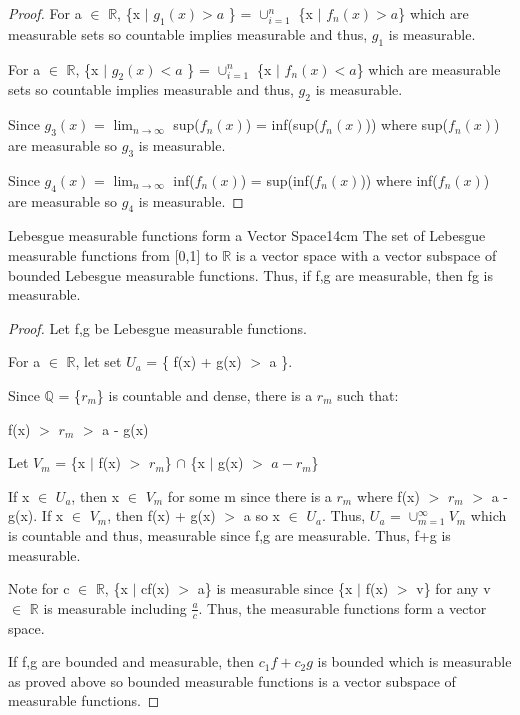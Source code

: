     \begin{proof}
        For a $\in$ $\mathbb{R}$, \{x $|$ $g_1(x) > a$ \}
        = $\cup_{i=1}^n$ \{x $|$ $f_n(x) > a$\}
        which are measurable sets so countable implies measurable
        and thus, $g_1$ is measurable.

        For a $\in$ $\mathbb{R}$, \{x $|$ $g_2(x) < a$ \}
        = $\cup_{i=1}^n$ \{x $|$ $f_n(x) < a$\}
        which are measurable sets so countable implies measurable
        and thus, $g_2$ is measurable.

        Since $g_3(x)$ = $\lim_{n \rightarrow \infty}$ sup($f_n(x)$)
        = inf(sup($f_n(x)$)) where sup($f_n(x)$) are measurable
        so $g_3$ is measurable.

        Since $g_4(x)$ = $\lim_{n \rightarrow \infty}$ inf($f_n(x)$)
        = sup(inf($f_n(x)$)) where inf($f_n(x)$) are measurable
        so $g_4$ is measurable.
    \end{proof}

    \newpage



    \begin{wtheorem}{Lebesgue measurable functions form a Vector Space}{14cm}
        The set of Lebesgue measurable functions from [0,1] to $\mathbb{R}$
        is a vector space with a vector subspace of bounded Lebesgue measurable
        functions. Thus, if f,g are measurable, then fg is measurable.
    \end{wtheorem}

    \begin{proof}
        Let f,g be Lebesgue measurable functions.

        For a $\in$ $\mathbb{R}$, let set $U_a$ = \{ f(x) + g(x) $>$ a \}.

        Since $\mathbb{Q}$ = \{$r_m$\} is countable and dense, there is a
        $r_m$ such that:

        \hspace{0.5cm}
        f(x) $>$ $r_m$ $>$ a - g(x)

        Let $V_m$ = \{x $|$ f(x) $>$ $r_m$\} $\cap$ \{x $|$ g(x) $>$ $a-r_m$\}
        
        If x $\in$ $U_a$, then x $\in$ $V_m$ for some m since
        there is a $r_m$ where f(x) $>$ $r_m$ $>$ a - g(x). 
        If x $\in$ $V_m$, then f(x) + g(x) $>$ a so x $\in$ $U_a$.
        Thus, $U_a$ = $\cup_{m=1}^{\infty} V_m$
        which is countable and thus, measurable since f,g are measurable.
        Thus, f+g is measurable.

        Note for c $\in$ $\mathbb{R}$, \{x $|$ cf(x) $>$ a\}
        is measurable since \{x $|$ f(x) $>$ v\} for any v $\in$ $\mathbb{R}$
        is measurable including $\frac{a}{c}$.
        Thus, the measurable functions form a vector space.

        If f,g are bounded and measurable, then $c_1f+c_2g$ is bounded which
        is measurable as proved above so bounded measurable functions is
        a vector subspace of measurable functions.
    \end{proof}

